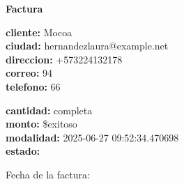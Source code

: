 \documentclass{article}
\begin{document}
\begin{center}
    {\LARGE \textbf{Factura}}\\[1cm]
\end{center}

\textbf{cliente:} Mocoa \\
\textbf{ciudad:} hernandezlaura@example.net \\
\textbf{direccion:} +573224132178 \\
\textbf{correo:} 94 \\
\textbf{telefono:} 66 \\

\vspace{0.5cm}

\textbf{cantidad:} completa \\
\textbf{monto:} \$exitoso \\
\textbf{modalidad:} 2025-06-27 09:52:34.470698 \\
\textbf{estado:}  \\

\vspace{1cm}

Fecha de la factura: 
\end{document}
